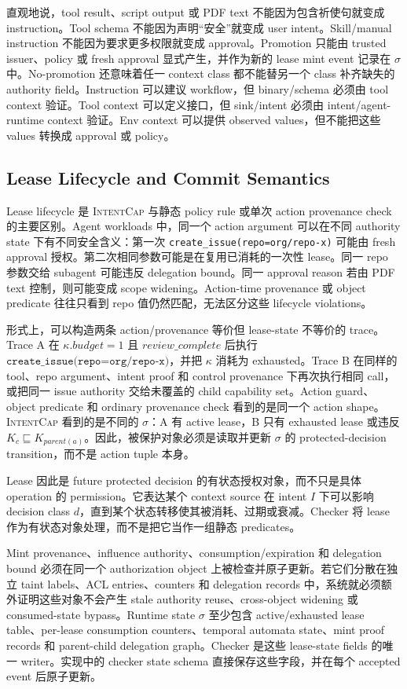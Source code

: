 \documentclass[UTF8,a4paper,11pt]{ctexart}
\newcommand{\sys}{\textsc{IntentCap}\xspace}
\begin{document}
直观地说，tool result、script output 或 PDF text 不能因为包含祈使句就变成 instruction。Tool schema 不能因为声明“安全”就变成 user intent。Skill/manual instruction 不能因为要求更多权限就变成 approval。Promotion 只能由 trusted issuer、policy 或 fresh approval 显式产生，并作为新的 lease mint event 记录在 \(\sigma\) 中。No-promotion 还意味着任一 context class 都不能替另一个 class 补齐缺失的 authority field。Instruction 可以建议 workflow，但 binary/schema 必须由 tool context 验证。Tool context 可以定义接口，但 sink/intent 必须由 intent/agent-runtime context 验证。Env context 可以提供 observed values，但不能把这些 values 转换成 approval 或 policy。

\subsection{Lease Lifecycle and Commit Semantics}

Lease lifecycle 是 \sys 与静态 policy rule 或单次 action provenance check 的主要区别。Agent workloads 中，同一个 action argument 可以在不同 authority state 下有不同安全含义：第一次 \texttt{create\_issue(repo=org/repo-x)} 可能由 fresh approval 授权。第二次相同参数可能是在复用已消耗的一次性 lease。同一 repo 参数交给 subagent 可能违反 delegation bound。同一 approval reason 若由 PDF text 控制，则可能变成 scope widening。Action-time provenance 或 object predicate 往往只看到 repo 值仍然匹配，无法区分这些 lifecycle violations。

形式上，可以构造两条 action/provenance 等价但 lease-state 不等价的 trace。Trace A 在 \(\kappa.budget=1\) 且 \(review\_complete\) 后执行
\(\texttt{create\_issue(repo=org/repo-x)}\)，并把 \(\kappa\) 消耗为 exhausted。Trace B 在同样的 tool、repo argument、intent proof 和 control provenance 下再次执行相同 call，或把同一 issue authority 交给未覆盖的 child capability set。Action guard、object predicate 和 ordinary provenance check 看到的是同一个 action shape。\sys 看到的是不同的 \(\sigma\)：A 有 active lease，B 只有 exhausted lease 或违反 \(K_c\sqsubseteq K_{parent(a)}\)。因此，被保护对象必须是读取并更新 \(\sigma\) 的 protected-decision transition，而不是 action tuple 本身。

Lease 因此是 future protected decision 的有状态授权对象，而不只是具体 operation 的 permission。它表达某个 context source 在 intent \(I\) 下可以影响 decision class \(d\)，直到某个状态转移使其被消耗、过期或衰减。Checker 将 lease 作为有状态对象处理，而不是把它当作一组静态 predicates。

Mint provenance、influence authority、consumption/expiration 和 delegation bound 必须在同一个 authorization object 上被检查并原子更新。若它们分散在独立 taint labels、ACL entries、counters 和 delegation records 中，系统就必须额外证明这些对象不会产生 stale authority reuse、cross-object widening 或 consumed-state bypass。Runtime state \(\sigma\) 至少包含 active/exhausted lease table、per-lease consumption counters、temporal automata state、mint proof records 和 parent-child delegation graph。Checker 是这些 lease-state fields 的唯一 writer。实现中的 checker state schema 直接保存这些字段，并在每个 accepted event 后原子更新。
\end{document}
